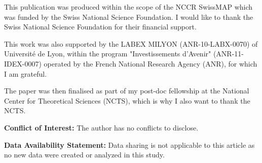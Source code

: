 \documentclass[a4paper,oneside,11pt]{scrartcl} %
\renewcommand{\listoffigures}{\begingroup
\tocsection
\tocfile{\listfigurename}{lof}
\endgroup}
\renewcommand{\listoftables}{\begingroup
\tocsection
\tocfile{\listtablename}{lot}
\endgroup}
\theoremstyle{plain}
\theoremstyle{remark}
\theoremstyle{definition}
\begin{document}
This publication was produced within the scope of the NCCR SwissMAP which was funded by the Swiss National Science Foundation. I would like to thank the Swiss National Science Foundation for their financial support.

This work was also supported by the LABEX MILYON (ANR-10-LABX-0070) of Universit\'{e} de Lyon, within the program "Investissements d'Avenir" (ANR-11-IDEX-0007) operated by the French National Research Agency (ANR), for which I am grateful.

The paper was then finalised as part of my post-doc fellowship at the National Center for Theoretical Sciences (NCTS), which is why I also want to thank the NCTS.

\textbf{Conflict of Interest:} The author has no conflicts to disclose.

\textbf{Data Availability Statement:} Data sharing is not applicable to this article as no new data were created or analyzed in this study.






\renewcommand\refname{List of References}




\end{document}
